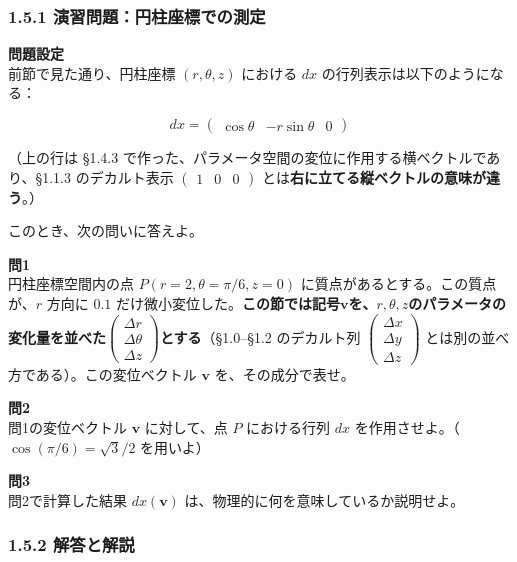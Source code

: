 \documentclass[a4paper,12pt,openany]{book}
\begin{document}
\hypertarget{ux6f14ux7fd2ux554fux984cux5186ux67f1ux5ea7ux6a19ux3067ux306eux6e2cux5b9a}{%
\subsubsection{1.5.1
演習問題：円柱座標での測定}\label{ux6f14ux7fd2ux554fux984cux5186ux67f1ux5ea7ux6a19ux3067ux306eux6e2cux5b9a}}

\textbf{問題設定}\\
前節で見た通り、円柱座標 \((r, \theta, z)\) における \(dx\)
の行列表示は以下のようになる：

\[
dx = \begin{pmatrix} \cos\theta & -r\sin\theta & 0 \end{pmatrix}
\]

（上の行は §1.4.3
で作った、パラメータ空間の変位に作用する横ベクトルであり、§1.1.3
のデカルト表示 \(\begin{pmatrix}1&0&0\end{pmatrix}\)
とは\textbf{右に立てる縦ベクトルの意味が違う}。）

このとき、次の問いに答えよ。

\textbf{問1}\\
円柱座標空間内の点 \(P(r=2, \theta=\pi/6, z=0)\)
に質点があるとする。この質点が、\(r\) 方向に \(0.1\)
だけ微小変位した。\textbf{この節では記号}\(\mathbf{v}\)\textbf{を、}\(r,\theta,z\)\textbf{のパラメータの変化量を並べた}\(\begin{pmatrix}\Delta r\\\Delta\theta\\\Delta z\end{pmatrix}\)\textbf{とする}（§1.0–§1.2
のデカルト列
\(\begin{pmatrix}\Delta x\\\Delta y\\\Delta z\end{pmatrix}\)
とは別の並べ方である）。この変位ベクトル \(\mathbf{v}\)
を、その成分で表せ。

\textbf{問2}\\
問1の変位ベクトル \(\mathbf{v}\) に対して、点 \(P\) における行列 \(dx\)
を作用させよ。（\(\cos(\pi/6) = \sqrt{3}/2\) を用いよ）

\textbf{問3}\\
問2で計算した結果 \(dx(\mathbf{v})\)
は、物理的に何を意味しているか説明せよ。

\hypertarget{ux89e3ux7b54ux3068ux89e3ux8aac}{%
\subsubsection{1.5.2 解答と解説}\label{ux89e3ux7b54ux3068ux89e3ux8aac}}
\end{document}
